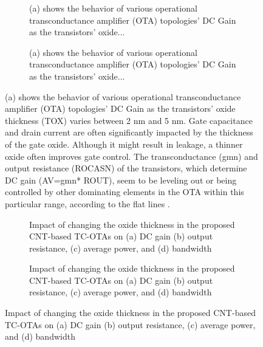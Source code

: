\begin{figure}[htbp]
  \centering
  \begin{subfigure}[b]{0.48\linewidth}
    \centering
    \caption{(a) shows the behavior of various operational transconductance amplifier (OTA) topologies' DC Gain as the transistors' oxide...}

  \end{subfigure}
  \hfill
  \begin{subfigure}[b]{0.48\linewidth}
    \centering
    \caption{(a) shows the behavior of various operational transconductance amplifier (OTA) topologies' DC Gain as the transistors' oxide...}

  \end{subfigure}
  \caption{(a) shows the behavior of various operational transconductance amplifier (OTA) topologies' DC Gain as the transistors' oxide thickness (TOX) varies between 2 nm and 5 nm. Gate capacitance and drain current are often significantly impacted by the thickness of the gate oxide. Although it might result in leakage, a thinner oxide often improves gate control. The transconductance (gmn) and output resistance (ROCASN) of the transistors, which determine DC gain (AV=gmn* ROUT), seem to be leveling out or being controlled by other dominating elements in the OTA within this particular range, according to the flat lines \cite{ref7,ref39}.}

  \label{fig:group_v6x7o}
\end{figure}

\begin{figure}[htbp]
  \centering
  \begin{subfigure}[b]{0.48\linewidth}
    \centering
    \caption{Impact of changing the oxide thickness in the proposed CNT-based TC-OTAs on (a) DC gain (b) output resistance, (c) average power, and (d) bandwidth}

  \end{subfigure}
  \hfill
  \begin{subfigure}[b]{0.48\linewidth}
    \centering
    \caption{Impact of changing the oxide thickness in the proposed CNT-based TC-OTAs on (a) DC gain (b) output resistance, (c) average power, and (d) bandwidth}

  \end{subfigure}
  \caption{Impact of changing the oxide thickness in the proposed CNT-based TC-OTAs on (a) DC gain (b) output resistance, (c) average power, and (d) bandwidth}

  \label{fig:group_orhfl}
\end{figure}

